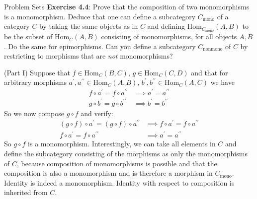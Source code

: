 \documentclass{report}
\begin{document}
\begin{exercises}{Problem Sets}
    \textbf{Exercise 4.4}: Prove that the composition of two monomorphisms is a monomorphism. Deduce that one can define a subcategory $C_{\text{mono}}$ of a category $C$ by taking the same objects as in $C$ and defining $\text{Hom}_{C_{\text{mono}}}(A, B)$ to be the subset of $\text{Hom}_{C}(A, B)$ consisting of monomorphisms, for all objects $A, B$. Do the same for epimorphisms. Can you define a subcategory $C_{\text{nonmono}}$ of $C$ by restricting to morphisms that are \textit{not} monomorphisms?
        \begin{answer}
            (Part I) Suppose that $f \in \text{Hom}_{C}(B, C)$, $g \in \text{Hom}_{C}(C, D)$ and that for arbitrary morphisms $a^{\prime}, a^{\prime\prime} \in \text{Hom}_{C}(A, B)$, $b^{\prime}, b^{\prime\prime} \in \text{Hom}_{C}(A, C)$ we have
                \begin{align*}
                    f \circ a^{\prime} = f \circ a^{\prime\prime} &\implies a^{\prime} = a^{\prime\prime}                               \\
                    g \circ b^{\prime} = g \circ b^{\prime\prime} &\implies                               b^{\prime} = b^{\prime\prime}   
                \end{align*}
            So we now compose $g \circ f$ and verify:
                \begin{align*}
                    (g \circ f) \circ a^{\prime} = (g \circ f) \circ a^{\prime\prime} &\implies  f \circ a^{\prime} = f \circ a^{\prime\prime} \\
                    f \circ a^{\prime} = f \circ a^{\prime\prime}                     &\implies  a^{\prime} = a^{\prime\prime}                   
                \end{align*}
            So $g \circ f$ is a monomorphism. Interestingly, we can take all elements in $C$ and define the subcategory consisting of the morphisms as only the monomorphisms of $C$, because composition of monomorphisms is possible and that the composition is also a monomorphism and is therefore a morphism in $C_{\text{mono}}$. Identity is indeed a monomorphism. Identity with respect to composition is inherited from $C$. 


\end{answer}
\end{exercises}
\end{document}
